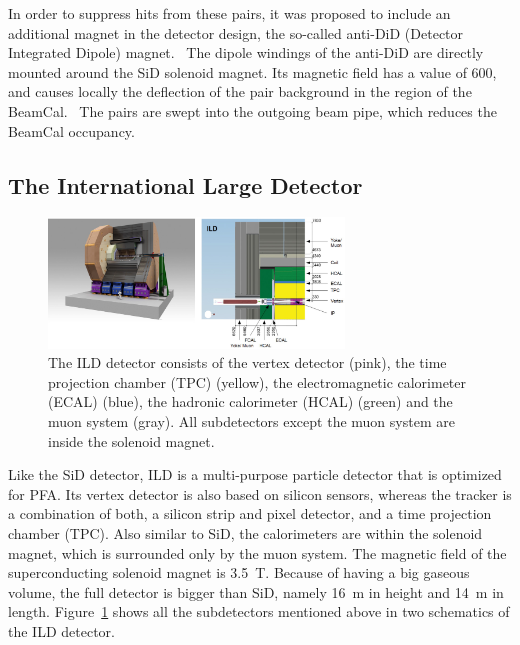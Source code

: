 \begin{itemize}
 In order to suppress hits from these \positron\electron pairs, it was proposed to include an additional magnet in the detector design, the so-called anti-DiD (Detector Integrated Dipole) magnet.~\cite{antiDiD}
 The dipole windings of the anti-DiD are directly mounted around the SiD solenoid magnet.
 Its magnetic field has a value of \SI{600}{\gauss}, and causes locally the deflection of the pair background in the region of the BeamCal.~\cite[p. 118]{TDR4}
 The pairs are swept into the outgoing beam pipe, which reduces the BeamCal occupancy.
\end{itemize}

\subsection{The International Large Detector} 
\begin{figure}[h]
\centering
\includegraphics[width=0.7\textwidth]{Figures/ILD.png}
\caption[Schematic drawing of the ILD detector]{The ILD detector consists of the vertex detector (pink), the time projection chamber (TPC) (yellow), the electromagnetic calorimeter (ECAL) (blue), the hadronic calorimeter (HCAL) (green) and the muon system (gray). All subdetectors except the muon system are inside the solenoid magnet.\cite[p. 34]{TDR1}}
\label{fig:ILD}
\end{figure}
Like the SiD detector, ILD is a multi-purpose particle detector that is optimized for PFA.
Its vertex detector is also based on silicon sensors, whereas the tracker is a combination of both, a silicon strip and pixel detector, and a time projection chamber (TPC).
Also similar to SiD, the calorimeters are within the solenoid magnet, which is surrounded only by the muon system.
The magnetic field of the superconducting solenoid magnet is \SI{3.5}{T}.
Because of having a big gaseous volume, the full detector is bigger than SiD, namely \SI{16}{m} in height and \SI{14}{m} in length.
Figure~\ref{fig:ILD} shows all the subdetectors mentioned above in two schematics of the ILD detector.